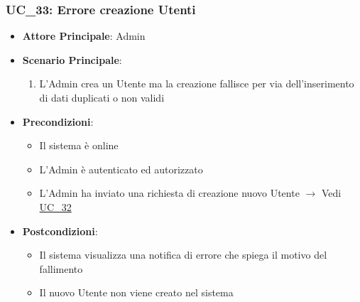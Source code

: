 \subsubsection{UC\_33: Errore creazione Utenti}
\label{uc_33}

\begin{itemize}
    \item \textbf{Attore Principale}: Admin
	 \item \textbf{Scenario Principale}:
	 \begin{enumerate}
		\item L'Admin crea un Utente ma la creazione fallisce per via dell'inserimento di dati duplicati o non validi
	 \end{enumerate}
	\item \textbf{Precondizioni}:
	\begin{itemize}
		\item Il sistema è online
		\item L'Admin è autenticato ed autorizzato
		\item L'Admin ha inviato una richiesta di creazione nuovo Utente $\rightarrow$ Vedi \hyperref[uc_32]{UC\_32}
	\end{itemize}
	\item \textbf{Postcondizioni}:
	\begin{itemize}
		\item Il sistema visualizza una notifica di errore che spiega il motivo del fallimento
		\item Il nuovo Utente non viene creato nel sistema
	\end{itemize}
\end{itemize}